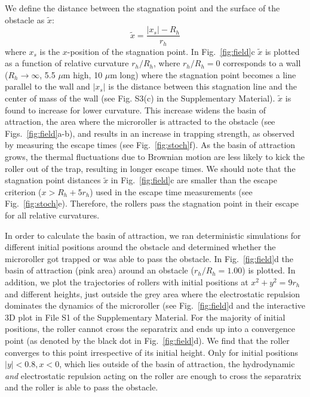 \documentclass[12pt]{article}
\begin{document}


We define the distance between the stagnation point and the surface of the obstacle as $\tilde{x}$:
\begin{equation}
\label{eq:stag_point}
    \tilde{x} = \frac{|x_s| - R_h}{r_h}
\end{equation}
where $x_s$ is the $x$-position of the stagnation point. In Fig.~\ref{fig:field}c $\tilde{x}$ is plotted as a function of relative curvature $r_h/R_h$, where $r_h/R_h=0$ corresponds to a wall ($R_h \to \infty$, 5.5 $\mu$m high, 10 $\mu$m long) where the stagnation point becomes a line parallel to the wall and $|x_s|$ is the distance between this stagnation line and the center of mass of the wall (see Fig. S3(c) in the Supplementary Material). $\tilde{x}$ is found to increase for lower curvature. 
This increase widens the basin of attraction, the area where the microroller is attracted to the obstacle (see Figs.~\ref{fig:field}a-b), and results in an increase in trapping strength, as observed by measuring the escape times (see Fig.~\ref{fig:stoch}f). As the basin of attraction grows, the thermal fluctuations due to Brownian motion are less likely to kick the roller out of the trap, resulting in longer escape times. 
We should note that the stagnation point distances $\tilde{x}$ in Fig.~\ref{fig:field}c are smaller than the escape criterion ($x > R_h+5r_h$) used in the escape time measurements (see Fig.~\ref{fig:stoch}e). Therefore, the rollers pass the stagnation point in their escape for all relative curvatures.

In order to calculate the basin of attraction, we ran deterministic simulations for different initial positions around the obstacle and determined whether the microroller got trapped or was able to pass the obstacle. In Fig.~\ref{fig:field}d the basin of attraction (pink area) around an obstacle ($r_h/R_h=1.00$) is plotted. In addition, we plot the trajectories of rollers with initial positions at $x^2+y^2 = 9r_h$ and different heights, just outside the grey area where the electrostatic repulsion dominates the dynamics of the microroller (see Fig.~\ref{fig:field}d and the interactive 3D plot in File S1 of the Supplementary Material.
For the majority of initial positions, the roller cannot cross the separatrix and ends up into a convergence point  (as denoted by the black dot in Fig.~\ref{fig:field}d). We find that the roller converges to this point irrespective of its initial height.
Only for initial positions $|y|<0.8, x<0$, which lies outside of the basin of attraction, the hydrodynamic \textit{and} electrostatic repulsion acting on the roller are enough to cross the separatrix and the roller is able to pass the obstacle.
\end{document}
